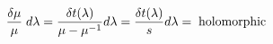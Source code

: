 \begin{equation}
{\delta \mu \over \mu}\;d\lambda = { \delta t(\lambda) \over \mu - \mu^{-1}}  d\lambda = 
 {\delta t(\lambda) \over  s} d\lambda =\; {\rm holomorphic}
 \label{holo1}
\end{equation}

